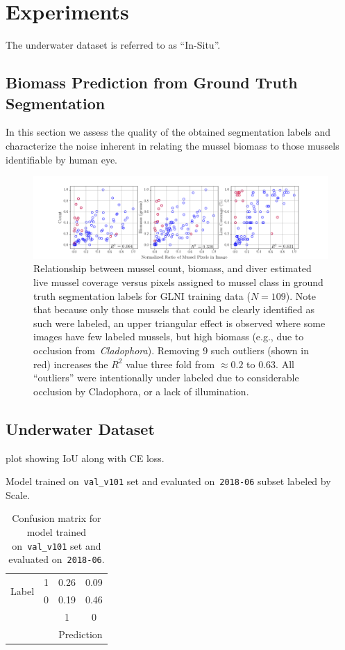 \documentclass[11pt]{article} %
\begin{document}
\section{Experiments}

The underwater dataset is referred to as ``In-Situ''.

\subsection{Biomass Prediction from Ground Truth Segmentation}

In this section we assess the quality of the obtained segmentation labels and
characterize the noise inherent in relating the mussel biomass to those mussels
identifiable by human eye.

\begin{figure}
\centering
\includegraphics[width=0.9\linewidth]{img/Train-all-109-annotate-outliers}
\caption{Relationship between mussel count, biomass, and diver estimated live
mussel coverage versus pixels assigned to mussel class in ground truth
segmentation labels for GLNI training data ($N=109$). Note that because only 
those mussels that could be clearly identified as such were labeled, an upper 
triangular effect is observed where some images have few labeled mussels, 
but high biomass (e.g., due to occlusion from~\emph{Cladophora}). Removing 9 
such outliers (shown in red) increases the $R^2$ value three fold from $\approx
0.2$ to $0.63$. All ``outliers'' were intentionally under labeled due to
considerable occlusion by Cladophora, or a lack of illumination.}
\label{fig:train-biomass-from-labels}
\end{figure}


\subsection{Underwater Dataset}

plot showing IoU along with CE loss.

Model trained on~\texttt{val\_v101} set and evaluated on~\texttt{2018-06}
subset labeled by Scale.

\begin{table}[]
\caption{Confusion matrix for model trained on~\texttt{val\_v101} set and
evaluated on~\texttt{2018-06}.}
\centering
\begin{tabular}{llcc}
\toprule
\multicolumn{1}{c}{\multirow{2}{*}{Label}} & \multicolumn{1}{c}{1} & 0.26 & 
0.09 \\ \cmidrule{2-4}
\multicolumn{1}{c}{} & \multicolumn{1}{c}{0} & 0.19 & 0.46 \\ \cmidrule{2-4}
 &  & 1 & 0 \\
 &  & \multicolumn{2}{c}{Prediction} \\ \bottomrule
\end{tabular}
\end{table}
\end{document}
